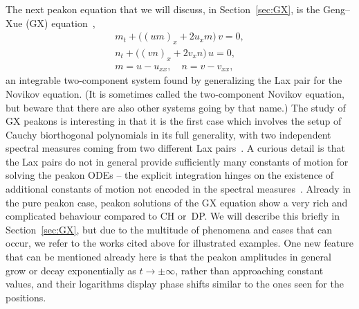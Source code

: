 \documentclass[10pt,a4paper]{article} \pdfoutput=1 
\begin{document}
The next peakon equation that we will discuss,
in Section~\ref{sec:GX},
is the Geng--Xue (GX) equation~\cite{geng-xue:2009:GX-peakon-equation-cubic-nonlinearity},
\begin{equation}
  \label{eq:intro-GX}
  \begin{gathered}
    m_t + \bigl( (u m)_x + 2 u_x m \bigr) \, v = 0
    , \\
    n_t + \bigl( (v n)_x + 2 v_x n \bigr) \, u = 0
    , \\
    m = u - u_{xx}
    ,\quad
    n = v - v_{xx}
    ,
  \end{gathered}
\end{equation}
an integrable two-component system found by generalizing the Lax pair
for the Novikov equation.
(It is sometimes called the two-component Novikov equation,
but beware that there are also other systems going by that name.)
The study of GX peakons is interesting in that it is the first case
which involves the setup of Cauchy biorthogonal polynomials in its full
generality, with two independent spectral measures coming from two
different Lax pairs~\cite{lundmark-szmigielski:2016:GX-inverse-problem,lundmark-szmigielski:2017:GX-dynamics-interlacing}.
A curious detail is that the Lax pairs do not in general provide sufficiently many
constants of motion for solving the peakon ODEs --
the explicit integration hinges on the existence of additional constants of motion
not encoded in the spectral measures~\cite{shuaib-lundmark:2019:GX-noninterlacing}.
Already in the pure peakon case,
peakon solutions of the GX equation show a very rich and complicated behaviour
compared to CH or~DP.
We will describe this briefly in Section~\ref{sec:GX},
but due to the multitude of phenomena and cases that can occur,
we refer to the works cited above for illustrated examples.
One new feature that can be mentioned already here is
that the peakon amplitudes in general grow or decay exponentially as $t \to \pm\infty$,
rather than approaching constant values,
and their logarithms display phase shifts similar to the ones seen for the positions.
\end{document}
